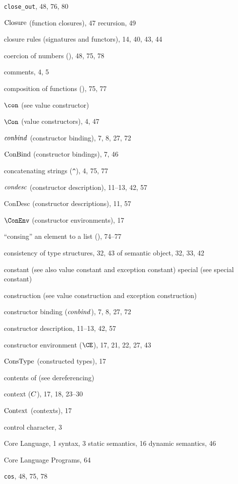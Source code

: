 \begin{theindex}
\item \verb+close_out+, 48, 76, 80
\item ${\rm Closure}$ (function closures), 47
\subitem recursion, 49
\item closure rules (signatures and functors), 14, 40, 43, 44
\item coercion of numbers (), 48, 75, 78
\item comments, 4, 5
\item composition of functions (), 75, 77
\item $\con$ (see value constructor) 
\item $\Con$ (value constructors), 4, 47
\item ${\it conbind}$ (constructor binding), 7, 8, 27, 72
\item ${\rm ConBind}$ (constructor bindings), 7, 46
\item concatenating strings (\verb+^+), 4, 75, 77
\item ${\it condesc}$ (constructor description), 11--13, 42, 57
\item ConDesc (constructor descriptions), 11, 57
\item $\ConEnv$ (constructor environments), 17
\item ``consing'' an element to a list (\ml{::}), 74--77
\item consistency 
\subitem of type structures, 32, 43
\subitem of semantic object, 32, 33, 42
\item constant (see also value constant and exception constant) 
\subitem special (see special constant) 
\item construction (see value construction and  exception construction) 
\item constructor binding (${\it conbind}$), 7, 8, 27, 72
\item constructor description, 11--13, 42, 57
\item constructor environment ($\CE$), 17, 21, 22, 27, 43
\item ${\rm ConsType}$ (constructed types), 17
\item contents of (see dereferencing) 
\item context ($C$), 17, 18, 23--30
\item $\rm Context$ (contexts), 17
\item control character, 3
\item Core Language, 1
\subitem syntax, 3
\subitem static semantics, 16
\subitem dynamic semantics, 46
\item Core Language Programs, 64
\item {\tt cos}, 48, 75, 78

\end{theindex}

